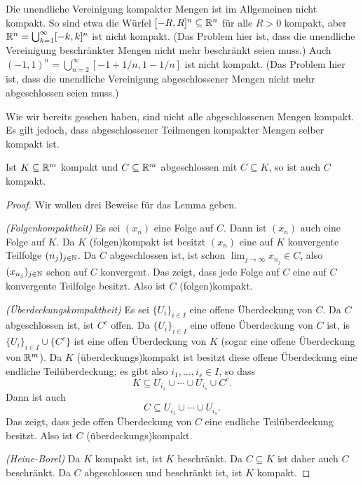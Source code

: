 \documentclass[a4paper,10pt]{article}
\begin{document}
\begin{bem}
 Die unendliche Vereinigung kompakter Mengen ist im Allgemeinen nicht kompakt. So sind etwa die Würfel $[-R, R]^n \subseteq \mathbb{R}^n$ für alle $R > 0$ kompakt, aber $\mathbb{R}^n = \bigcup_{k=1}^\infty [-k,k]^n$ ist nicht kompakt. (Das Problem hier ist, dass die unendliche Vereinigung beschränkter Mengen nicht mehr beschränkt seien muss.) Auch $(-1,1)^n = \bigcup_{n=2}^\infty [-1+1/n, 1-1/n]$ ist nicht kompakt. (Das Problem hier ist, dass die unendliche Vereinigung abgeschlossener Mengen nicht mehr abgeschlossen seien muss.)
\end{bem}


Wie wir bereits gesehen haben, sind nicht alle abgeschlossenen Mengen kompakt. Es gilt jedoch, dass abgeschlossener Teilmengen kompakter Mengen selber kompakt ist.


\begin{lem}
 Ist $K \subseteq \mathbb{R}^m$ kompakt und $C \subseteq \mathbb{R}^m$ abgeschlossen mit $C \subseteq K$, so ist auch $C$ kompakt.
\end{lem}
\begin{proof}
 Wir wollen drei Beweise für das Lemma geben.
 
 \emph{(Folgenkompaktheit)} Es sei $(x_n)$ eine Folge auf $C$. Dann ist $(x_n)$ auch eine Folge auf $K$. Da $K$ (folgen)kompakt ist besitzt $(x_n)$ eine auf $K$ konvergente Teilfolge $(n_j)_{j \in \mathbb{N}}$. Da $C$ abgeschlossen ist, ist schon $\lim_{j \to \infty} x_{n_j} \in C$, also $(x_{n_j})_{j \in \mathbb{N}}$ schon auf $C$ konvergent. Das zeigt, dass jede Folge auf $C$ eine auf $C$ konvergente Teilfolge besitzt. Also ist $C$ (folgen)kompakt.
 
 \emph{(Überdeckungskompaktheit)} Es sei $\{U_i\}_{i \in I}$ eine offene Überdeckung von $C$. Da $C$ abgeschlossen ist, ist $C^c$ offen. Da $\{U_i\}_{i \in I}$ eine offene Überdeckung von $C$ ist, is $\{U_i\}_{i \in I} \cup \{C^c\}$ ist eine offen Überdeckung von $K$ (sogar eine offene Überdeckung von $\mathbb{R}^m$). Da $K$ (überdeckungs)kompakt ist besitzt diese offene Überdeckung eine endliche Teilüberdeckung; es gibt also $i_1, \dotsc, i_s \in I$, so dass
 \[
  K \subseteq U_{i_1} \cup \dotsb \cup U_{i_s} \cup C^c.
 \]
 Dann ist auch
 \[
  C \subseteq U_{i_1} \cup \dotsb \cup U_{i_s}.
 \]
 Das zeigt, dass jede offen Überdeckung von $C$ eine endliche Teilüberdeckung besitzt. Also ist $C$ (überdeckungs)kompakt.
 
 \emph{(Heine-Borel)} Da $K$ kompakt ist, ist $K$ beschränkt. Da $C \subseteq K$ ist daher auch $C$ beschränkt. Da $C$ abgeschlossen und beschränkt ist, ist $K$ kompakt.
\end{proof}
\end{document}
